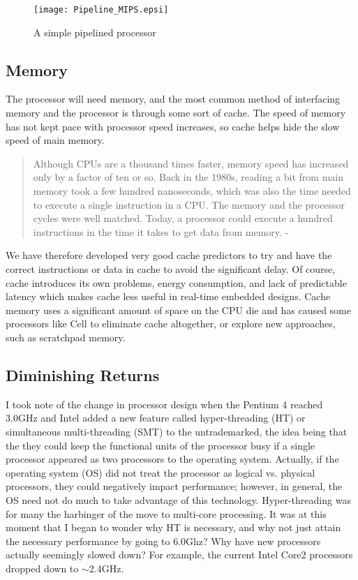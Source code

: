 \documentclass[12pt,twoside,letterpaper]{article}
\begin{document}
\begin{figure}
	\begin{center}
		\texttt{[image: Pipeline\_MIPS.epsi]}
	\end{center}
	
	\caption{A simple pipelined processor}
	\label{mips_pipeline}
\end{figure}

\subsection*{Memory}
The processor will need memory, and the most common method of interfacing memory and the processor is through some sort of cache. The speed of memory has not kept pace with processor speed increases, so cache helps hide the slow speed of main memory.  

\begin{quote}
Although CPUs are a thousand times faster, memory speed has increased only by a factor of ten or so. Back in the 1980s, reading a bit from main memory took a few hundred nanoseconds, which was also the time needed to execute a single instruction in a CPU. The memory and the processor cycles were well matched. Today, a processor could execute a hundred instructions in the time it takes to get data from memory. - \cite{Hayes:2007p4}
\end{quote}

We have therefore developed very good cache predictors to try and have the correct instructions or data in cache to avoid the significant delay. Of course, cache introduces its own problems, energy consumption, and lack of predictable latency which makes cache less useful in real-time embedded designs. Cache memory uses a significant amount of space on the CPU die and has caused some processors like Cell to eliminate cache altogether, or explore new approaches, such as scratchpad memory.

\subsection*{Diminishing Returns}
I took note of the change in processor design when the Pentium 4 reached 3.0GHz and Intel added a new feature called hyper-threading (HT) or simultaneous multi-threading (SMT) to the untrademarked, the idea being that the they could keep the functional units of the processor busy if a single processor appeared as two processors to the operating system. Actually, if the operating system (OS) did not treat the processor as logical vs. physical processors, they could negatively impact performance; however, in general, the OS need not do much to take advantage of this technology. Hyper-threading was for many the harbinger of the move to multi-core processing. It was at this moment that I began to wonder why HT is necessary, and why not just attain the necessary performance by going to 6.0Ghz? Why have new processors actually seemingly slowed down? For example, the current Intel Core2 processors dropped down to $\sim$2.4GHz.
\end{document}
